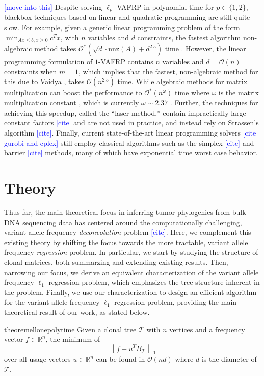 \documentclass[10pt]{article}
\newcommand{\henri}[1]{\textcolor{blue}{[#1]}}
\newcommand{\tree}{\mathcal{T}}
\begin{document}
\henri{move into this}
Despite solving $\ell_p$-VAFRP in polynomial time for $p \in \{1, 2\}$, blackbox techniques based on 
linear and quadratic programming are still quite slow. For example, given a generic linear programming
problem of the form $\min_{Ax \leq b, x \geq 0} c^Tx$, with $n$ variables and $d$ constraints, the fastest
algorithm non-algebraic method \cite{cohen2021solving} takes 
$\mathcal{O}^*\left(\sqrt{d}\cdot\text{nnz}(A)+d^{2.5}\right)$ time \cite{lee2014path, lee2015efficient}. 
However, the linear programming formulation of $1$-VAFRP contains $n$ variables and 
$d = \mathcal{O}(n)$ constraints when $m = 1$, which implies that the fastest, non-algebraic method for this due to 
Vaidya \cite{vaidya1987algorithm, vaidya1996new}, takes $\mathcal{O}(n^{2.5})$ time. While algebraic methods
for matrix multiplication can boost the performance to $\mathcal{O}^*(n^{\omega})$ time where $\omega$ is
the matrix multiplication constant \cite{cohen2021solving}, which is currently $\omega \sim 2.37$ 
\cite{alman2021refined}. Further, the techniques for achieving this speedup, called the ``laser method,'' contain
impractically large constant factors \henri{cite} and are not used in practice, and instead rely on Strassen's algorithm \henri{cite}.
Finally, current state-of-the-art linear programming 
solvers \henri{cite gurobi and cplex} still employ classical algorithms such
as the simplex \henri{cite} and barrier \henri{cite} methods, many of which have exponential time 
worst case behavior.

\section{Theory}
Thus far, the main theoretical focus in inferring tumor phylogenies from bulk DNA sequencing data 
has centered around the computationally challenging, variant allele frequency \emph{deconvolution} 
problem \henri{cite}. Here, we complement this existing theory by shifting the focus 
towards the more tractable, variant allele frequency \emph{regression} problem. In 
particular, we start by studying the structure of clonal matrices, both summarzing 
and extending existing results. Then, narrowing our focus, we derive an equivalent
characterization of the variant allele frequency $\ell_1$-regression problem, which 
emphasizes the tree structure inherent in the problem. Finally, we use our
characterization to design an efficient algorithm for the variant allele 
frequency $\ell_1$-regression problem, providing the main theoretical result of 
our work, as stated below. 
\begin{restatable}{theorem}{ellonepolytime}
    \label{thm:ellonepolytime}
    Given a clonal tree $\tree$ with $n$ vertices and a frequency vector $f \in \mathbb{R}^n$, the
    minimum of 
    \[\left\lVert f - u^T B_{\tree}\right\rVert_1 \]
    over all usage vectors $u \in \mathbb{R}^n$ can be found in $\mathcal{O}(nd)$ where $d$ is 
    the diameter of $\tree$.
\end{restatable}
\end{document}
